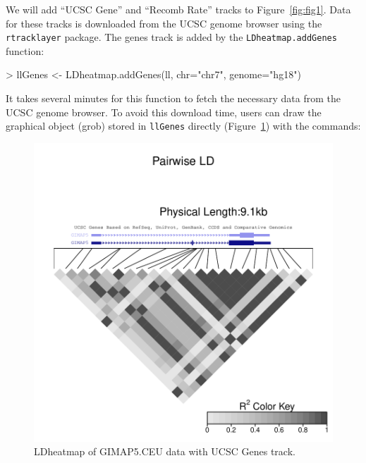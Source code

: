 \documentclass{article}
\begin{document}
We will add ``UCSC Gene'' and ``Recomb Rate'' tracks 
to Figure~\ref{fig:fig1}. Data for these tracks is downloaded from the
UCSC genome browser using the \texttt{rtracklayer} package.
The genes track is added by the \texttt{LDheatmap.addGenes} function:
\begin{Schunk}
\begin{Sinput}
> llGenes <- LDheatmap.addGenes(ll, chr="chr7", genome="hg18")
\end{Sinput}
\end{Schunk}
It takes several minutes for this function to fetch the necessary data 
from the UCSC genome browser. 
To avoid this download time, users can draw the graphical object (grob) 
stored in \texttt{llGenes} directly (Figure~\ref{fig:fig2}) with 
the commands:
\begin{Schunk}
\end{Schunk}
\begin{figure}
\begin{center}
\includegraphics{addTracks-fig2}
\end{center}
\caption{LDheatmap of GIMAP5.CEU data with UCSC Genes track.}
\label{fig:fig2}
\end{figure}
\end{document}
